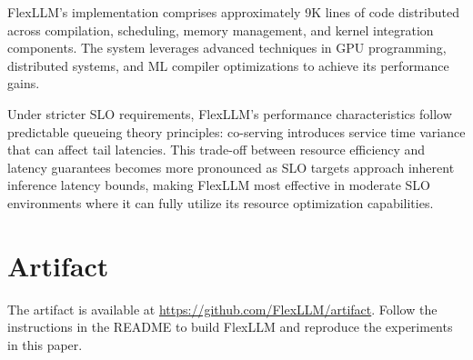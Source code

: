 FlexLLM's implementation comprises approximately 9K lines of code distributed across compilation, scheduling, memory management, and kernel integration components. The system leverages advanced techniques in GPU programming, distributed systems, and ML compiler optimizations to achieve its performance gains.

Under stricter SLO requirements, FlexLLM's performance characteristics follow predictable queueing theory principles: co-serving introduces service time variance that can affect tail latencies. This trade-off between resource efficiency and latency guarantees becomes more pronounced as SLO targets approach inherent inference latency bounds, making FlexLLM most effective in moderate SLO environments where it can fully utilize its resource optimization capabilities.

\section{Artifact}
The artifact is available at \url{https://github.com/FlexLLM/artifact}. Follow the instructions in the README to build FlexLLM and reproduce the experiments in this paper.